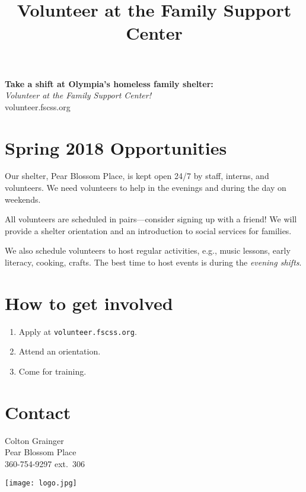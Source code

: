 \documentclass[14pt]{extarticle}
\title{Volunteer at the Family Support Center}
\begin{document}
\pagestyle{empty}
\noindent
{\Huge \bf Take a shift at Olympia's homeless family shelter:}\\
{\LARGE \emph{Volunteer at the Family Support Center!}}\\
{\Huge {} \selectfont volunteer.fscss.org}

\section*{Spring 2018 Opportunities}

\large
Our shelter, Pear Blossom Place, is kept open 24/7 by staff, interns, and volunteers. We need volunteers to help in the evenings and during the day on weekends. 

All volunteers are scheduled in pairs---consider signing up with a friend! We will provide a shelter orientation and an introduction to social services for families.

We also schedule volunteers to host regular activities, e.g., music lessons, early literacy, cooking, crafts. The best time to host events is during the \emph{evening shifts}.

\section*{How to get involved}
\begin{enumerate}[itemsep=0pt]
	\item Apply at {\Large\texttt{volunteer.fscss.org}}.
    \item Attend an orientation. 
    \item Come for training.
\end{enumerate}
\normalsize
\section*{Contact}
Colton Grainger\\
Pear Blossom Place\\
360-754-9297 ext.\ 306

\vspace{-140pt}
\begin{flushright}
\texttt{[image: logo.jpg]}
\end{flushright}
\end{document}
